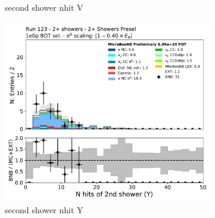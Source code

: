\begin{figure}[H]
\begin{subfigure}{0.3\textwidth}
    \caption{second shower nhit V}
    \end{subfigure}
    \begin{subfigure}{0.3\textwidth}
    \includegraphics[width=1.0\textwidth]{Sidebands/Figures/TwoShr_1e0pSel/BDT/secondshower_Y_nhit.pdf}
    \caption{second shower nhit Y}
    \end{subfigure}
    \caption{} 
    \label{fig:HE_1eNp_1}
\end{figure}

